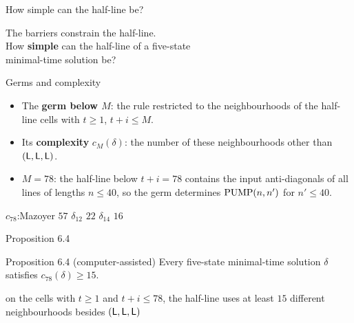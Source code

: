 
\begin{frame}{How simple can the half-line be?}
\vspace{5ex}
\begin{center}\Large
The barriers constrain the half-line.\\[2ex]
How \textbf{simple} can the half-line of a five-state\\ minimal-time solution be?
\end{center}
\end{frame}

\begin{frame}{Germs and complexity}
\begin{itemize}
\item The \textbf{germ below $M$}: the rule restricted to the neighbourhoods of the half-line cells with $t\ge1$, $t+i\le M$.
\item Its \textbf{complexity} $c_M(\delta)$: the number of these neighbourhoods other than $(\mathsf L,\mathsf L,\mathsf L)$.
\item $M=78$: the half-line below $t+i=78$ contains the input anti-diagonals of all lines of lengths $n\le40$, so the germ determines $\mathrm{PUMP}(n,n')$ for $n'\le40$.
\end{itemize}
\vspace{1ex}
\begin{center}
$c_{78}$:\quad Mazoyer $57$ \qquad $\delta_{12}$ $22$ \qquad $\delta_{14}$ $16$
\end{center}
\end{frame}

\begin{frame}{Proposition 6.4}
\vspace{4ex}
\begin{statement}{Proposition 6.4 (computer-assisted)}
Every five-state minimal-time solution $\delta$ satisfies $c_{78}(\delta)\ge15$.
\end{statement}
\vspace{2ex}
\begin{center}on the cells with $t\ge1$ and $t+i\le78$, the half-line uses at least $15$ different neighbourhoods besides $(\mathsf L,\mathsf L,\mathsf L)$\end{center}
\end{frame}

